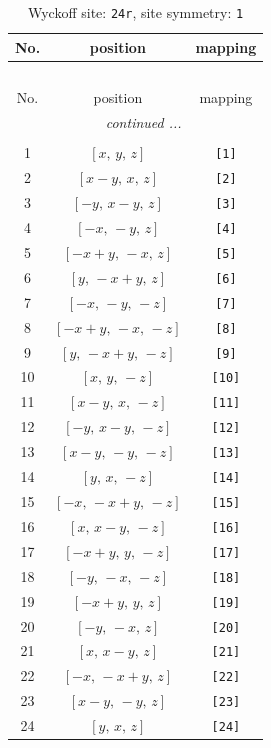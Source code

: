 \documentclass[fleqn,8pt]{jsarticle}
\begin{document}
\begin{longtable}{ccc}
\caption{Wyckoff site: {\tt 24r}, site symmetry: {\tt 1}}
 \\
 \hline \hline
No. & position & mapping \\ \hline \endfirsthead

\multicolumn{2}{l}{\tablename\ \thetable{}} \\
 \hline \hline
No. & position & mapping \\ \hline \endhead

 \hline \hline
\multicolumn{2}{r}{\footnotesize\it continued ...} \\ \endfoot

 \hline \hline
\multicolumn{2}{r}{} \\ \endlastfoot

1 & $\left[ x,\, y,\, z \right]$ & {\tt [1]} \\ \hline
2 & $\left[ x - y,\, x,\, z \right]$ & {\tt [2]} \\ \hline
3 & $\left[ - y,\, x - y,\, z \right]$ & {\tt [3]} \\ \hline
4 & $\left[ - x,\, - y,\, z \right]$ & {\tt [4]} \\ \hline
5 & $\left[ - x + y,\, - x,\, z \right]$ & {\tt [5]} \\ \hline
6 & $\left[ y,\, - x + y,\, z \right]$ & {\tt [6]} \\ \hline
7 & $\left[ - x,\, - y,\, - z \right]$ & {\tt [7]} \\ \hline
8 & $\left[ - x + y,\, - x,\, - z \right]$ & {\tt [8]} \\ \hline
9 & $\left[ y,\, - x + y,\, - z \right]$ & {\tt [9]} \\ \hline
10 & $\left[ x,\, y,\, - z \right]$ & {\tt [10]} \\ \hline
11 & $\left[ x - y,\, x,\, - z \right]$ & {\tt [11]} \\ \hline
12 & $\left[ - y,\, x - y,\, - z \right]$ & {\tt [12]} \\ \hline
13 & $\left[ x - y,\, - y,\, - z \right]$ & {\tt [13]} \\ \hline
14 & $\left[ y,\, x,\, - z \right]$ & {\tt [14]} \\ \hline
15 & $\left[ - x,\, - x + y,\, - z \right]$ & {\tt [15]} \\ \hline
16 & $\left[ x,\, x - y,\, - z \right]$ & {\tt [16]} \\ \hline
17 & $\left[ - x + y,\, y,\, - z \right]$ & {\tt [17]} \\ \hline
18 & $\left[ - y,\, - x,\, - z \right]$ & {\tt [18]} \\ \hline
19 & $\left[ - x + y,\, y,\, z \right]$ & {\tt [19]} \\ \hline
20 & $\left[ - y,\, - x,\, z \right]$ & {\tt [20]} \\ \hline
21 & $\left[ x,\, x - y,\, z \right]$ & {\tt [21]} \\ \hline
22 & $\left[ - x,\, - x + y,\, z \right]$ & {\tt [22]} \\ \hline
23 & $\left[ x - y,\, - y,\, z \right]$ & {\tt [23]} \\ \hline
24 & $\left[ y,\, x,\, z \right]$ & {\tt [24]} \\
\end{longtable}
\end{document}

